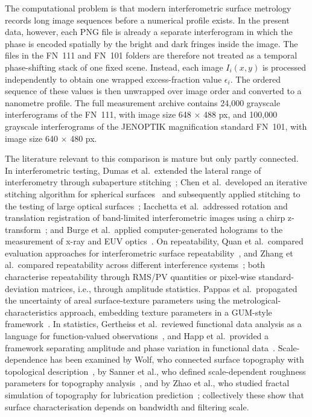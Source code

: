 \documentclass[review]{elsarticle}
\begin{document}
The computational problem is that modern interferometric surface metrology records long image sequences before a numerical profile exists. In the present data, however, each PNG file is already a separate interferogram in which the phase is encoded spatially by the bright and dark fringes inside the image. The files in the FN~111 and FN~101 folders are therefore not treated as a temporal phase-shifting stack of one fixed scene. Instead, each image $I_i(x,y)$ is processed independently to obtain one wrapped excess-fraction value $\epsilon_i$. The ordered sequence of these values is then unwrapped over image order and converted to a nanometre profile. The full measurement archive contains 24,000 grayscale interferograms of the FN~111, with image size 648 $\times$ 488 px, and 100,000 grayscale interferograms of the JENOPTIK magnification standard FN~101, with image size 640 $\times$ 480 px.

The literature relevant to this comparison is mature but only partly connected. In interferometric testing, Dumas et al.\ extended the lateral range of interferometry through subaperture stitching~\cite{Dumas2003134}; Chen et al.\ developed an iterative stitching algorithm for spherical surfaces~\cite{Chen20061219} and subsequently applied stitching to the testing of large optical surfaces~\cite{Chen20073504}; Iacchetta et al.\ addressed rotation and translation registration of band-limited interferometric images using a chirp z-transform~\cite{Iacchetta2016}; and Burge et al.\ applied computer-generated holograms to the measurement of x-ray and EUV optics~\cite{Burge2025}. On repeatability, Quan et al.\ compared evaluation approaches for interferometric surface repeatability~\cite{Quan2016}, and Zhang et al.\ compared repeatability across different interference systems~\cite{Zhang2018}; both characterise repeatability through RMS/PV quantities or pixel-wise standard-deviation matrices, i.e., through amplitude statistics. Pappas et al.\ propagated the uncertainty of areal surface-texture parameters using the metrological-characteristics approach, embedding texture parameters in a GUM-style framework~\cite{Pappas2023419}. In statistics, Gertheiss et al.\ reviewed functional data analysis as a language for function-valued observations~\cite{Gertheiss2024}, and Happ et al.\ provided a framework separating amplitude and phase variation in functional data~\cite{Happ2019}. Scale-dependence has been examined by Wolf, who connected surface topography with topological description~\cite{Wolf2020}, by Sanner et al., who defined scale-dependent roughness parameters for topography analysis~\cite{Sanner2022}, and by Zhao et al., who studied fractal simulation of topography for lubrication prediction~\cite{Zhao2021}; collectively these show that surface characterisation depends on bandwidth and filtering scale.
\end{document}
